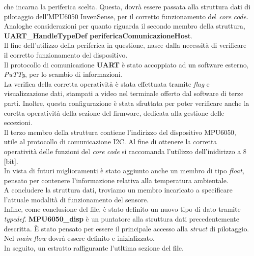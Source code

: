 \documentclass[11pt]{report}
\begin{document}
che incarna la periferica scelta. Questa, dovrà essere passata alla struttura dati di pilotaggio dell'MPU6050 InvenSense, per il corretto funzionamento del \textit{core code}.
Analoghe considerazioni per quanto riguarda il secondo membro della struttura, \textbf{UART\_HandleTypeDef perifericaComunicazioneHost}. 
\\Il fine dell'utilizzo della periferica in questione, nasce dalla necessità di verificare il corretto funzionamento del dispositivo.\\
Il protocollo di comunicazione \textbf{UART} è stato accoppiato ad un software esterno, \textit{PuTTy}, per lo scambio di informazioni.\\
La verifica della corretta operatività è stata effettuata tramite \textit{flag} e visualizzazione dati, stampati a video nel terminale offerto dal software di terze parti. Inoltre, questa configurazione è stata sfruttata per poter verificare anche la coretta operatività della sezione del firmware, dedicata alla gestione delle eccezioni.\\
Il terzo membro della struttura contiene l'indirizzo del dispositivo MPU6050, utile al protocollo di comunicazione I2C. Al fine di ottenere la corretta operatività delle funzioni del \textit{core code} si raccomanda l'utilizzo dell'inidirizzo a 8 [bit].\\
In vista di futuri miglioramenti è stato aggiunto anche un membro di tipo \textit{float}, pensato per contenere l'informazione relativa alla temperatura ambientale.\\
A concludere la struttura dati, troviamo un membro incaricato a specificare l'attuale modalità di funzionamento del sensore.\\
Infine, come conclusione del file, è stato definito un nuovo tipo di dato tramite \textit{typedef}. \textbf{MPU6050\_disp} è un puntatore alla struttura dati precedentemente descritta. È stato pensato per essere il principale accesso alla \textit{struct} di pilotaggio. Nel \textit{main flow} dovrà essere definito e inizializzato.\\
In seguito, un estratto raffigurante l'utltima sezione del file.\\\\

\end{document}
